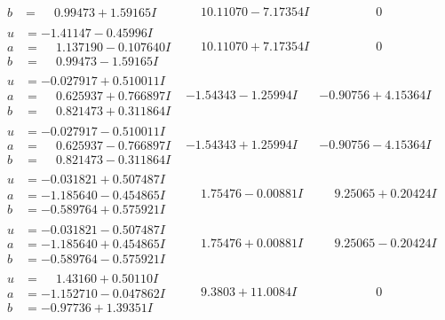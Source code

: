 \documentclass[1p]{elsarticle_modified}
\theoremstyle{definition}
\begin{document}
$$\begin{array}{c|c|c}
\begin{aligned}
b &= \phantom{-}0.99473 + 1.59165 I\end{aligned}
 & \phantom{-}10.11070 - 7.17354 I & \phantom{-0.000000 } 0 \\ \hline\begin{aligned}
u &= -1.41147 - 0.45996 I \\
a &= \phantom{-}1.137190 - 0.107640 I \\
b &= \phantom{-}0.99473 - 1.59165 I\end{aligned}
 & \phantom{-}10.11070 + 7.17354 I & \phantom{-0.000000 } 0 \\ \hline\begin{aligned}
u &= -0.027917 + 0.510011 I \\
a &= \phantom{-}0.625937 + 0.766897 I \\
b &= \phantom{-}0.821473 + 0.311864 I\end{aligned}
 & -1.54343 - 1.25994 I & -0.90756 + 4.15364 I \\ \hline\begin{aligned}
u &= -0.027917 - 0.510011 I \\
a &= \phantom{-}0.625937 - 0.766897 I \\
b &= \phantom{-}0.821473 - 0.311864 I\end{aligned}
 & -1.54343 + 1.25994 I & -0.90756 - 4.15364 I \\ \hline\begin{aligned}
u &= -0.031821 + 0.507487 I \\
a &= -1.185640 - 0.454865 I \\
b &= -0.589764 + 0.575921 I\end{aligned}
 & \phantom{-}1.75476 - 0.00881 I & \phantom{-}9.25065 + 0.20424 I \\ \hline\begin{aligned}
u &= -0.031821 - 0.507487 I \\
a &= -1.185640 + 0.454865 I \\
b &= -0.589764 - 0.575921 I\end{aligned}
 & \phantom{-}1.75476 + 0.00881 I & \phantom{-}9.25065 - 0.20424 I \\ \hline\begin{aligned}
u &= \phantom{-}1.43160 + 0.50110 I \\
a &= -1.152710 - 0.047862 I \\
b &= -0.97736 + 1.39351 I\end{aligned}
 & \phantom{-}9.3803 + 11.0084 I & \phantom{-0.000000 } 0 \\ \hline\begin{aligned}

\end{aligned}
\end{array}$$
\end{document}

